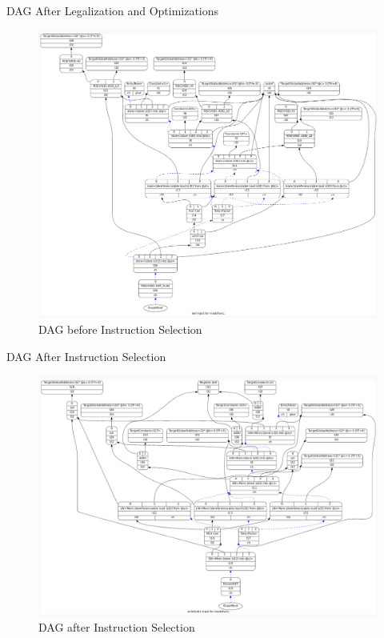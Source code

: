\begin{frame}{DAG After Legalization and Optimizations}
    \begin{figure}
    \centering
    \includegraphics[height=0.75\textheight]{path_instruction/madd_dag_isel.png}
    \caption{DAG before Instruction Selection}
    \label{fig:isel}
\end{figure}
\end{frame}

\begin{frame}{DAG After Instruction Selection}
    \begin{figure}
    \centering
    \includegraphics[height=0.75\textheight]{path_instruction/madd_dag_sched.png}
    \caption{DAG after Instruction Selection}
    \label{fig:dag_sched}
\end{figure}
\end{frame}



